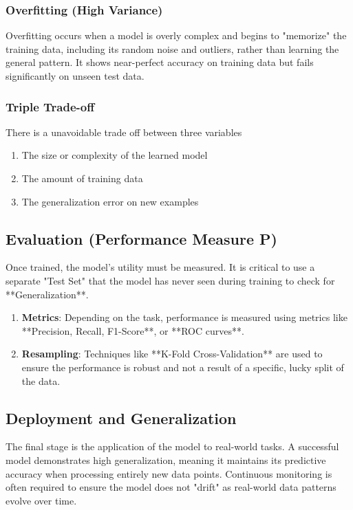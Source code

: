 \documentclass[12pt]{article}
\begin{document}
\subsubsection{Overfitting (High Variance)}
Overfitting occurs when a model is overly complex and begins to "memorize" the training data, including its random noise and outliers, rather than learning the general pattern. It shows near-perfect accuracy on training data but fails significantly on unseen test data.

\subsubsection{Triple Trade-off}
There is a unavoidable trade off between three variables
\begin{enumerate}
  \item The size or complexity of the learned model
  \item The amount of training data
  \item The generalization error on new examples
\end{enumerate}

\subsection{Evaluation (Performance Measure P)}

Once trained, the model's utility must be measured. It is critical to use a separate "Test Set" that the model has never seen during training to check for **Generalization**.
\begin{enumerate}
  \item \textbf{Metrics}: Depending on the task, performance is measured using metrics like **Precision, Recall, F1-Score**, or **ROC curves**.
  \item \textbf{Resampling}: Techniques like **K-Fold Cross-Validation** are used to ensure the performance is robust and not a result of a specific, lucky split of the data.
\end{enumerate}
\subsection{Deployment and Generalization}

The final stage is the application of the model to real-world tasks. A successful model demonstrates high generalization, meaning it maintains its predictive accuracy when processing entirely new data points. Continuous monitoring is often required to ensure the model does not "drift" as real-world data patterns evolve over time.
\end{document}
